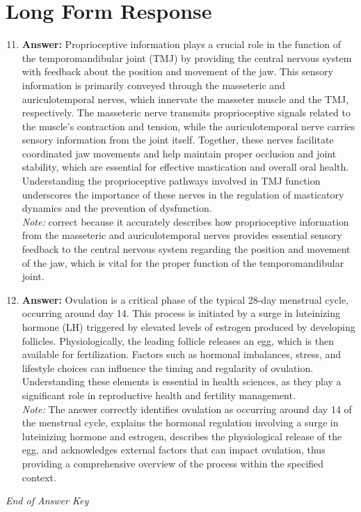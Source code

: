 \documentclass[12pt]{article}
\begin{document}
\section*{Long Form Response}
\begin{enumerate}[label=\arabic*.]
\setcounter{enumi}{10}
\item \textbf{Answer:} Proprioceptive information plays a crucial role in the function of the temporomandibular joint (TMJ) by providing the central nervous system with feedback about the position and movement of the jaw. This sensory information is primarily conveyed through the masseteric and auriculotemporal nerves, which innervate the masseter muscle and the TMJ, respectively. The masseteric nerve transmits proprioceptive signals related to the muscle's contraction and tension, while the auriculotemporal nerve carries sensory information from the joint itself. Together, these nerves facilitate coordinated jaw movements and help maintain proper occlusion and joint stability, which are essential for effective mastication and overall oral health. Understanding the proprioceptive pathways involved in TMJ function underscores the importance of these nerves in the regulation of masticatory dynamics and the prevention of dysfunction.
\\ \textit{Note:} correct because it accurately describes how proprioceptive information from the masseteric and auriculotemporal nerves provides essential sensory feedback to the central nervous system regarding the position and movement of the jaw, which is vital for the proper function of the temporomandibular joint.
\item \textbf{Answer:} Ovulation is a critical phase of the typical 28-day menstrual cycle, occurring around day 14. This process is initiated by a surge in luteinizing hormone (LH) triggered by elevated levels of estrogen produced by developing follicles. Physiologically, the leading follicle releases an egg, which is then available for fertilization. Factors such as hormonal imbalances, stress, and lifestyle choices can influence the timing and regularity of ovulation. Understanding these elements is essential in health sciences, as they play a significant role in reproductive health and fertility management.
\\ \textit{Note:} The answer correctly identifies ovulation as occurring around day 14 of the menstrual cycle, explains the hormonal regulation involving a surge in luteinizing hormone and estrogen, describes the physiological release of the egg, and acknowledges external factors that can impact ovulation, thus providing a comprehensive overview of the process within the specified context.
\end{enumerate}

\vfill
\noindent\textit{End of Answer Key}
\end{document}
